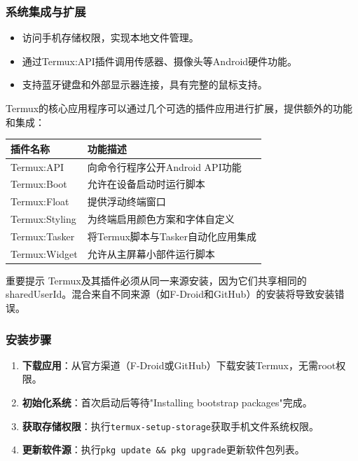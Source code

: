 \subsubsection*{系统集成与扩展}

\begin{itemize}
  \item 访问手机存储权限，实现本地文件管理。
  \item 通过Termux:API插件调用传感器、摄像头等Android硬件功能。
  \item 支持蓝牙键盘和外部显示器连接，具有完整的鼠标支持。
\end{itemize}


Termux的核心应用程序可以通过几个可选的插件应用进行扩展，提供额外的功能和集成：

\begin{center}
\begin{tabularx}{\linewidth}{|X|X|}
\hline
\textbf{插件名称} & \textbf{功能描述} \tabularnewline
\hline
Termux:API & 向命令行程序公开Android API功能 \tabularnewline
Termux:Boot & 允许在设备启动时运行脚本 \tabularnewline
Termux:Float & 提供浮动终端窗口 \tabularnewline
Termux:Styling & 为终端启用颜色方案和字体自定义 \tabularnewline
Termux:Tasker & 将Termux脚本与Tasker自动化应用集成 \tabularnewline
Termux:Widget & 允许从主屏幕小部件运行脚本 \tabularnewline
\hline
\end{tabularx}
\end{center}

\begin{tcbwarn}{重要提示}
Termux及其插件必须从同一来源安装，因为它们共享相同的sharedUserId。混合来自不同来源（如F-Droid和GitHub）的安装将导致安装错误。

\end{tcbwarn}


\subsubsection*{安装步骤}

\begin{enumerate}
  \item \textbf{下载应用}：从官方渠道（F-Droid或GitHub）下载安装Termux，无需root权限。
  \item \textbf{初始化系统}：首次启动后等待"Installing bootstrap packages"完成。
  \item \textbf{获取存储权限}：执行\texttt{termux-\allowbreak setup-\allowbreak storage}获取手机文件系统权限。
  \item \textbf{更新软件源}：执行\texttt{pkg update \&\& pkg upgrade}更新软件包列表。
\end{enumerate}

